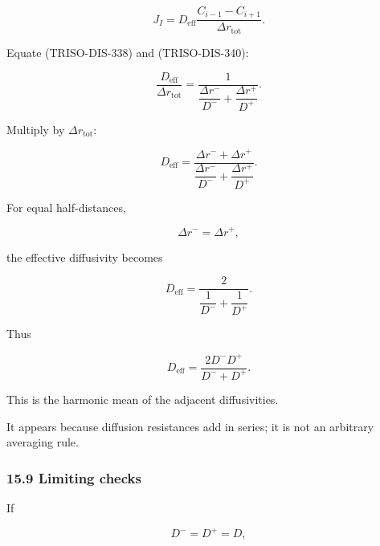 \documentclass[11pt,a4paper]{article}
\begin{document}
\begin{equation}
J_I
=
D_{\mathrm{eff}}
\frac{
C_{i-1}-C_{i+1}
}{
\Delta r_{\mathrm{tot}}
}.
\tag{TRISO-DIS-340}
\label{eq:triso-dis-340}
\end{equation}

Equate (TRISO-DIS-338) and (TRISO-DIS-340):

\begin{equation}
\frac{D_{\mathrm{eff}}}{\Delta r_{\mathrm{tot}}}
=
\frac1{
\dfrac{\Delta r^-}{D^-}
+
\dfrac{\Delta r^+}{D^+}
}.
\tag{TRISO-DIS-341}
\label{eq:triso-dis-341}
\end{equation}

Multiply by $\Delta r_{\mathrm{tot}}$:

\begin{equation}
\boxed{
D_{\mathrm{eff}}
=
\frac{
\Delta r^-+\Delta r^+
}{
\dfrac{\Delta r^-}{D^-}
+
\dfrac{\Delta r^+}{D^+}
}.
}
\tag{TRISO-DIS-342}
\label{eq:triso-dis-342}
\end{equation}

For equal half-distances,

\begin{equation}
\Delta r^-=\Delta r^+,
\tag{TRISO-DIS-343}
\label{eq:triso-dis-343}
\end{equation}

the effective diffusivity becomes

\begin{equation}
D_{\mathrm{eff}}
=
\frac{2}{
\dfrac1{D^-}
+
\dfrac1{D^+}
}.
\tag{TRISO-DIS-344}
\label{eq:triso-dis-344}
\end{equation}

Thus

\begin{equation}
\boxed{
D_{\mathrm{eff}}
=
\frac{
2D^-D^+
}{
D^-+D^+
}.
}
\tag{TRISO-DIS-345}
\label{eq:triso-dis-345}
\end{equation}

This is the harmonic mean of the adjacent diffusivities.

It appears because diffusion resistances add in series; it is not an arbitrary averaging rule.

\subsubsection*{15.9 Limiting checks}

If

\begin{equation}
D^-=D^+=D,
\tag{TRISO-DIS-346}
\label{eq:triso-dis-346}
\end{equation}
\end{document}
